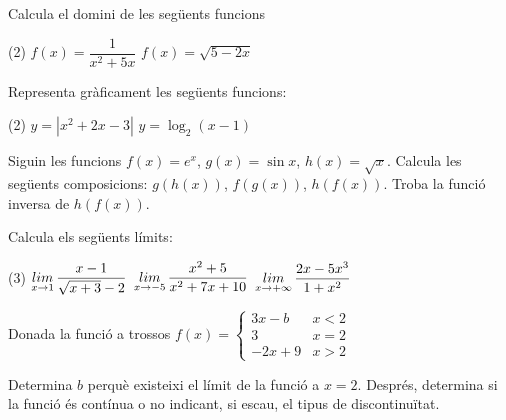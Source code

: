 
\begin{mylist}
	\exer[2] Calcula el domini de les següents funcions
	\begin{tasks}(2)
		\task $f(x)=\dfrac{1}{x^2+5x}$
		\task $f(x)=\sqrt{5-2x}$
	\end{tasks}
	\answers{a) $\mathbb{R}-\{0, -5\}$, b) $(-\infty, 5/2]$}
	
	\exer[2] Representa gràficament les següents funcions:
	\begin{tasks}(2)
		\task $y=|x^2 + 2x -3|$
		\task $y=\log_2(x-1)$
	\end{tasks}
	
	\exer[2] Siguin les funcions $f(x)=e^x$, $g(x)=\sin x$, $h(x)=\sqrt{x}$. Calcula les següents composicions: $g(h(x))$, $f(g(x))$, $h(f(x))$. Troba la funció inversa de $h(f(x))$.
	
	\exer[2] Calcula els següents límits:
	\begin{tasks}(3)
		\task $\mathop{lim}\limits_{x\to 1}\dfrac{x-1}{\sqrt{x+3}-2}$
		\task $\mathop{lim}\limits_{x\to -5}\dfrac{x^2+5}{x^2+7x+10}$
		\task $\mathop{lim}\limits_{x\to +\infty}\dfrac{2x-5x^3}{1+x^2}$
	\end{tasks}
	
	\exer[2] Donada la funció a trossos $f(x)=\left\{ 
	\begin{array}{ll}
	3x-b & x<2 \\
	3    & x=2 \\
	-2x+9& x>2
	\end{array}
	\right.$
	\begin{tasks}
	\task Determina $b$ perquè existeixi el límit de la funció a $x=2$.
	\task Després, determina si la funció és contínua o no indicant, si escau, el tipus de  discontinuïtat.
	\end{tasks}
	

\end{mylist}
